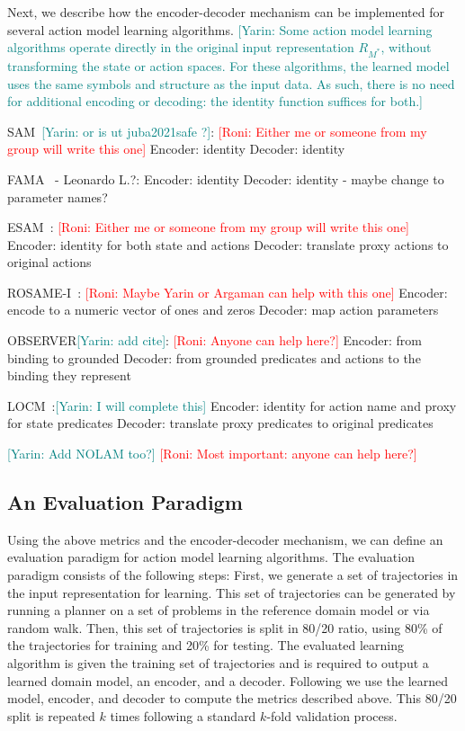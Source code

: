 \documentclass{article}
\theoremstyle{definition}
\theoremstyle{remark}
\newcommand{\realm}{\ensuremath{M^*}\xspace}
\newcommand{\roni}[1]{{\textcolor{red}{[Roni: #1]}}}
\newcommand{\yarin}[1]{{\textcolor{teal}{[Yarin: #1]}}}
\begin{document}
Next, we describe how the encoder-decoder mechanism can be implemented for several action model learning algorithms. \yarin{Some action model learning algorithms operate directly in the original input representation $R_{\realm}$, without transforming the state or action spaces. For these algorithms, the learned model uses the same symbols and structure as the input data. As such, there is no need for additional encoding or decoding: the identity function suffices for both.}

SAM~\citep{stern2017efficient}\yarin{or is ut juba2021safe ?}: \roni{Either me or someone from my group will write this one}
Encoder: identity
Decoder: identity

FAMA~\citep{aineto2019learning} - Leonardo L.?:
Encoder: identity
Decoder: identity - maybe change to parameter names?

ESAM~\citep{juba2021safe}: \roni{Either me or someone from my group will write this one}
Encoder: identity for both state and actions     
Decoder: translate proxy actions to original actions

ROSAME-I~\citep{xi2024neuro}: \roni{Maybe Yarin or Argaman can help with this one}
Encoder: encode to a numeric vector of ones and zeros
Decoder: map action parameters

OBSERVER\yarin{add cite}: \roni{Anyone can help here?}
Encoder: from binding to grounded
Decoder: from grounded predicates and actions to the binding they represent

LOCM~\citep{cresswell2013acquiring}:\yarin{I will complete this}
Encoder: identity for action name and proxy for state predicates
Decoder: translate proxy predicates to original predicates

\yarin{Add NOLAM too?}
\roni{Most important: anyone can help here?}


\subsection{An Evaluation Paradigm}
Using the above metrics and the encoder-decoder mechanism, we can define an evaluation paradigm for action model learning algorithms.
The evaluation paradigm consists of the following steps: 
First, we generate a set of trajectories in the input representation for learning. 
This set of trajectories can be generated by running a planner on a set of problems in the reference domain model or via random walk.
Then, this set of trajectories is split in 80/20 ratio, using 80\% of the trajectories for training and 20\% for testing. 
The evaluated learning algorithm is given the training set of trajectories and is required to output a learned domain model, an encoder, and a decoder. 
Following we use the learned model, encoder, and decoder to compute the metrics described above. 
This 80/20 split is repeated $k$ times following a standard $k$-fold validation process. 
\end{document}
